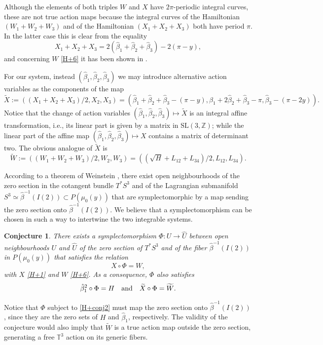 \documentclass[a4paper,11pt,reqno]{amsart}
\newtheorem{conj}[thm]{Conjecture}
\theoremstyle{definition}
\numberwithin{equation}{section}
\newcommand{\be}{\begin{equation}}
\newcommand{\ee}{\end{equation}}
\def\bT{{\mathbb T}}                        %
\def\bZ{{\mathbb Z}}                        %
\begin{document}
Although the elements of both triples $W$ and $X$ have $2\pi$-periodic integral curves, these are not  true action maps
because the integral curves of the Hamiltonian
$(W_1 + W_2 + W_3)$ and of the Hamiltonian $(X_1 + X_2 + X_3)$ both have period $\pi$.
In the latter case this is clear from the equality
\be
X_1 + X_2 + X_3 = 2( \hat \beta_1 + \hat \beta_2 + \hat \beta_3) - 2(\pi - y),
\label{H+2}\ee
and concerning  $W$ \eqref{H+6} it has been shown in \cite{McLH}.


For our system, instead $(\hat \beta_1, \hat \beta_2, \hat \beta_3)$ we may introduce alternative action variables as
the components of the map
\be
\widetilde{X}:= ((X_1 + X_2 + X_3)/2, X_2, X_3) = (\hat \beta_1 + \hat \beta_2 + \hat \beta_3 - (\pi - y),
\hat \beta_1 + 2 \hat \beta_2 + \hat \beta_3 - \pi, \hat \beta_3 - (\pi - 2y)).
\label{W+8}\ee
Notice that  the change of action variables $(\hat \beta_1, \hat \beta_2, \hat \beta_3) \mapsto \widetilde X$
is an integral affine transformation, i.e., its linear part is given by a matrix in $\mathrm{SL}(3,\bZ)$;
while the linear part of
the affine map  $(\hat \beta_1, \hat \beta_2, \hat \beta_3) \mapsto X$ contains a matrix of determinant two.
The obvious analogue of $\widetilde{X}$ is
\be
\widetilde{W}:= ((W_1 + W_2 + W_3)/2, W_2, W_3) = ((\sqrt{H} + L_{12} + L_{34})/2, L_{12}, L_{34}).
\ee

According to a theorem of Weinstein \cite{W}, there exist open neighbourhoods of the zero section in  the cotangent bundle $T^*S^3$
and of the Lagrangian
submanifold $S^3\simeq \hat \beta^{-1}(I(2)) \subset P(\mu_0(y))$ that are symplectomorphic by a map  sending   the zero section onto $\hat \beta^{-1}(I(2))$.
We believe that a symplectomorphism can be chosen in such a way to intertwine the two integrable systems.

\begin{conj}
There exists a symplectomorphism  $\Phi: U \to \widehat U$  between open
 neighbourhoods $U$ and $\widehat U$ of the zero section of $T^*S^3$ and of the fiber $\hat \beta^{-1}(I(2))$  in $P(\mu_0(y))$
that satisfies the relation
\be
X \circ \Phi = W,
\label{H+conj1}\ee
 with $X$ \eqref{H+1} and $W$ \eqref{H+6}.
As a consequence, $\Phi$ also satisfies
\be
\hat \beta_1^2 \circ \Phi = H
\quad\hbox{and}\quad
 \widetilde{X} \circ \Phi = \widetilde{W}.
 \label{H+conj2}\ee
\end{conj}


 Notice that $\Phi$ subject to \eqref{H+conj2} must map
the zero section onto $\hat \beta^{-1}(I(2))$, since they are the zero sets of $H$ and $\hat \beta_1$, respectively.
The validity of the conjecture would also imply that $\widetilde{W}$ is a true action map outside the zero section,
generating a free $\bT^3$ action on its generic fibers.
\end{document}
